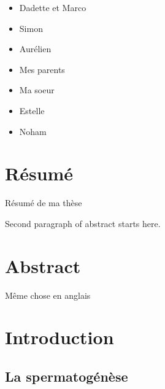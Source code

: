 \documentclass[12pt,twoside]{reedthesis}
\theoremstyle{definition}
\theoremstyle{definition}
\theoremstyle{remark}
\begin{document}
  \begin{itemize}
  \item
    Dadette et Marco\\
  \item
    Simon\\
  \item
    Aurélien
  \item
    Mes parents\\
  \item
    Ma soeur
  \item
    Estelle\\
  \item
    Noham
  \end{itemize}
  
  \chapter*{Résumé}\label{resume}
  
  Résumé de ma thèse \par
  Second paragraph of abstract starts here.
  
  \chapter*{Abstract}\label{abstract}
  
  Même chose en anglais
  
  \chapter{Introduction}\label{introInf}
  
  \section{La spermatogénèse}\label{la-spermatogenese}
  
\end{document}
